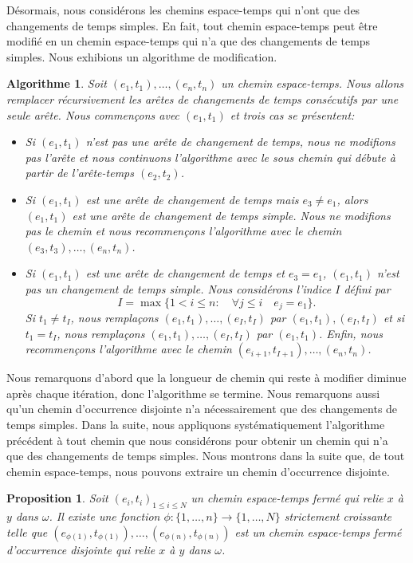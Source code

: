 \documentclass[titlepage,a4paper,12pt]{article}
\newcounter{d}
\newcounter{t}
\newcounter{p}
\newcounter{c}
\newcounter{a}
\newcounter{l}
\newtheorem{prop}[p]{Proposition}
\newtheorem{algo}[a]{Algorithme}
\begin{document}
Désormais, nous considérons les chemins espace-temps qui n'ont que des changements de temps simples. En fait, tout chemin espace-temps peut être modifié en un chemin espace-temps qui n'a que des changements de temps simples. Nous exhibions un algorithme de modification.
\begin{algo} \label{algoconca}
Soit $(e_1,t_1),\dots,(e_n,t_n)$ un chemin espace-temps. Nous allons remplacer récursivement les arêtes de changements de temps consécutifs par une seule arête. Nous commençons avec $(e_1,t_1)$ et trois cas se présentent:
\begin{itemize}[label = $\bullet$, leftmargin = *]
\item Si $(e_1,t_1)$ n'est pas une arête de changement de temps, nous ne modifions pas l'arête et nous continuons l'algorithme avec le sous chemin qui débute à partir de l'arête-temps $(e_2,t_2)$.
\item Si $(e_1,t_1)$ est une arête de changement de temps mais $e_3\neq e_1$, alors $(e_1,t_1)$ est une arête de changement de temps simple. Nous ne modifions pas le chemin et nous recommençons l'algorithme avec le chemin $(e_3,t_3),\dots,(e_n,t_n)$.
\item Si $(e_1,t_1)$ est une arête de changement de temps et $e_3= e_1$, $(e_1,t_1)$ n'est pas un changement de temps simple. Nous considérons l'indice $I$ défini par
$$ I = \max\big\{1<i\leqslant n: \quad \forall j \leqslant i\quad e_j = e_1\big\}.
$$
Si $t_1\neq t_I$, nous remplaçons $(e_1,t_1),\dots,(e_I,t_I)$ par $(e_1,t_1),(e_I,t_I)$ et si $t_1 = t_I$, nous remplaçons $(e_1,t_1),\dots,(e_I,t_I)$ par $(e_1,t_1)$. Enfin, nous recommençons l'algorithme avec le chemin $(e_{i+1},t_{I+1}),\dots,(e_n,t_n)$. 
\end{itemize}
\end{algo}
Nous remarquons d'abord que la longueur de chemin qui reste à modifier diminue après chaque itération, donc l'algorithme se termine. Nous remarquons aussi qu'un chemin d'occurrence disjointe n'a nécessairement que des changements de temps simples. Dans la suite, nous appliquons systématiquement l'algorithme précédent à tout chemin que nous considérons pour obtenir un chemin qui n'a que des changements de temps simples.
Nous montrons dans la suite que, de tout chemin espace-temps, nous pouvons extraire un chemin d'occurrence disjointe. 
\begin{prop} \label{ocdis}
Soit $(e_i,t_i)_{1\leqslant i \leqslant N}$ un chemin espace-temps fermé qui relie $x$ à $y$ dans $\omega$. Il existe une fonction $\phi: \{1,\dots, n\}\rightarrow \{1,\dots, N\}$ strictement croissante telle que $(e_{\phi(1)},t_{\phi(1)}),\dots,(e_{\phi(n)},t_{\phi(n)})$ est un chemin espace-temps fermé d'occurrence disjointe qui relie $x$ à $y$ dans $\omega$.
\end{prop}
\end{document}

